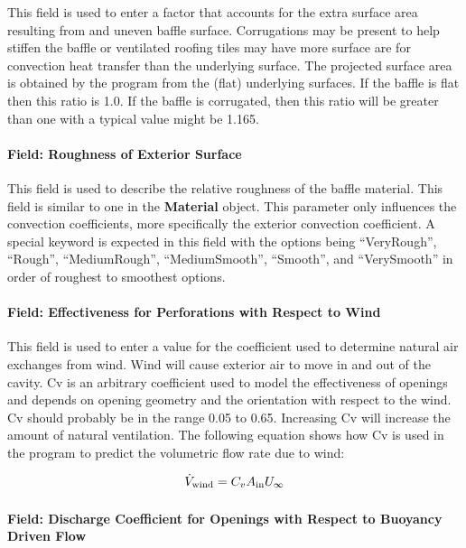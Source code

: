 This field is used to enter a factor that accounts for the extra surface area resulting from and uneven baffle surface. Corrugations may be present to help stiffen the baffle or ventilated roofing tiles may have more surface are for convection heat transfer than the underlying surface. The projected surface area is obtained by the program from the (flat) underlying surfaces. If the baffle is flat then this ratio is 1.0. If the baffle is corrugated, then this ratio will be greater than one with a typical value might be 1.165.

\paragraph{Field: Roughness of Exterior Surface}\label{field-roughness-of-exterior-surface}

This field is used to describe the relative roughness of the baffle material. This field is similar to one in the \textbf{Material} object. This parameter only influences the convection coefficients, more specifically the exterior convection coefficient. A special keyword is expected in this field with the options being ``VeryRough'', ``Rough'', ``MediumRough'', ``MediumSmooth'', ``Smooth'', and ``VerySmooth'' in order of roughest to smoothest options.

\paragraph{Field: Effectiveness for Perforations with Respect to Wind}\label{field-effectiveness-for-perforations-with-respect-to-wind}

This field is used to enter a value for the coefficient used to determine natural air exchanges from wind. Wind will cause exterior air to move in and out of the cavity. Cv is an arbitrary coefficient used to model the effectiveness of openings and depends on opening geometry and the orientation with respect to the wind. Cv should probably be in the range 0.05 to 0.65. Increasing Cv will increase the amount of natural ventilation. The following equation shows how Cv is used in the program to predict the volumetric flow rate due to wind:

\begin{equation}
  \dot{V}_{\rm{wind}} = C_v A_{\rm{in}} U_{\infty}
\end{equation}

\paragraph{Field: Discharge Coefficient for Openings with Respect to Buoyancy Driven Flow}\label{field-discharge-coefficient-for-openings-with-respect-to-buoyancy-driven-flow}

